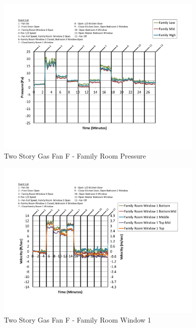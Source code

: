 \documentclass{article}
\begin{document}
\begin{appendices}
	\begin{figure}[H]
		\centering
		\includegraphics[height=3.05in,trim=0.67in 1.1in 0.67in 0.8in,clip=true]{0_Images/Results_Charts/ColdFlow/Two_Story/Gas/F/Family_Room_Pressure.pdf}
		\caption{Two Story Gas Fan F - Family Room Pressure}
	\end{figure}
 

	\begin{figure}[H]
		\centering
		\includegraphics[height=3.05in,trim=0.67in 1.1in 0.67in 0.8in,clip=true]{0_Images/Results_Charts/ColdFlow/Two_Story/Gas/F/Family_Room_Window_1.pdf}
		\caption{Two Story Gas Fan F - Family Room Window 1}
	\end{figure}
 
	\clearpage


\end{appendices}
\end{document}
